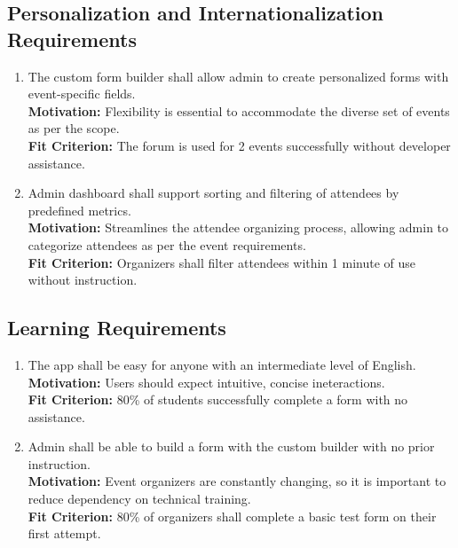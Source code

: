 \documentclass[12pt]{article}
\begin{document}
\subsection{Personalization and Internationalization Requirements}
\begin{enumerate}[label=UHR-PIR.\arabic*, wide=0pt, leftmargin=*]
  \item \label{UHPIR1}The custom form builder shall allow admin to create personalized forms with event-specific fields.\\[2mm]
    {\bf Motivation:} Flexibility is essential to accommodate the diverse set of events as per the scope.\\
    {\bf Fit Criterion:} The forum is used for 2 events successfully without developer assistance.
  \item \label{UHPIR2} Admin dashboard shall support sorting and filtering of attendees by predefined metrics.\\[2mm]
    {\bf Motivation:} Streamlines the attendee organizing process, allowing admin to categorize attendees as per the event requirements.\\
    {\bf Fit Criterion:} Organizers shall filter attendees within 1 minute of use without instruction.
\end{enumerate}

\subsection{Learning Requirements}
\begin{enumerate}[label=\bfseries LR-\arabic*:, wide=0pt, leftmargin=*,ref=\bfseries UHR-LR\arabic*]
  \item \label{UHLR1} The app shall be easy for anyone with an intermediate level of English.\\[2mm]
    {\bf Motivation:} Users should expect intuitive, concise ineteractions.\\
    {\bf Fit Criterion:} 80\% of students successfully complete a form with no assistance.
  \item \label{UHLR2} Admin shall be able to build a form with the custom builder with no prior instruction.\\[2mm]
    {\bf Motivation:} Event organizers are constantly changing, so it is important to reduce dependency on technical training.\\
    {\bf Fit Criterion:} 80\% of organizers shall complete a basic test form on their first attempt.
\end{enumerate}
\end{document}
